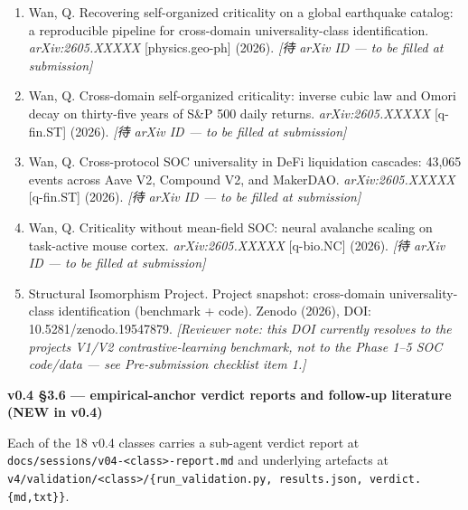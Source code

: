 \documentclass[
  11pt]{article}
\providecommand{\tightlist}{%
  \setlength{\itemsep}{0pt}\setlength{\parskip}{0pt}}
\begin{document}
\begin{enumerate}
\def\labelenumi{\arabic{enumi}.}
\setcounter{enumi}{40}
\tightlist
\item
  Wan, Q. Recovering self-organized criticality on a global earthquake
  catalog: a reproducible pipeline for cross-domain universality-class
  identification. \emph{arXiv:2605.XXXXX} {[}physics.geo-ph{]} (2026).
  \emph{{[}待 arXiv ID --- to be filled at submission{]}}
\item
  Wan, Q. Cross-domain self-organized criticality: inverse cubic law and
  Omori decay on thirty-five years of S\&P 500 daily returns.
  \emph{arXiv:2605.XXXXX} {[}q-fin.ST{]} (2026). \emph{{[}待 arXiv ID
  --- to be filled at submission{]}}
\item
  Wan, Q. Cross-protocol SOC universality in DeFi liquidation cascades:
  43,065 events across Aave V2, Compound V2, and MakerDAO.
  \emph{arXiv:2605.XXXXX} {[}q-fin.ST{]} (2026). \emph{{[}待 arXiv ID
  --- to be filled at submission{]}}
\item
  Wan, Q. Criticality without mean-field SOC: neural avalanche scaling
  on task-active mouse cortex. \emph{arXiv:2605.XXXXX} {[}q-bio.NC{]}
  (2026). \emph{{[}待 arXiv ID --- to be filled at submission{]}}
\item
  Structural Isomorphism Project. Project snapshot: cross-domain
  universality-class identification (benchmark + code). Zenodo (2026),
  DOI: 10.5281/zenodo.19547879. \emph{{[}Reviewer note: this DOI
  currently resolves to the project\textquotesingle s V1/V2
  contrastive-learning benchmark, not to the Phase 1--5 SOC code/data
  --- see Pre-submission checklist item 1.{]}}
\end{enumerate}

\textbf{v0.4 §3.6 --- empirical-anchor verdict reports and follow-up
literature (NEW in v0.4)}

Each of the 18 v0.4 classes carries a sub-agent verdict report at
\texttt{docs/sessions/v04-<class>-report.md} and underlying artefacts at
\texttt{v4/validation/<class>/\{run\_validation.py, results.json,
verdict.\{md,txt\}\}}.
\end{document}
